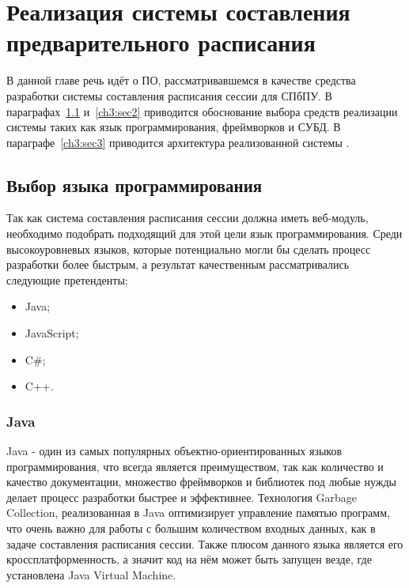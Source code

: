 \chapter{Реализация системы составления предварительного расписания} \label{ch3}
В данной главе речь идёт о ПО, рассматривавшемся в качестве средства разработки системы составления расписания сессии для СПбПУ. В параграфах~\ref{ch3:sec1} и~\ref{ch3:sec2} приводится обоснование выбора средств реализации системы таких как язык программирования, фреймворков и СУБД. В параграфе~\ref{ch3:sec3} приводится архитектура реализованной системы .


\section{Выбор языка программирования} \label{ch3:sec1}
Так как система составления расписания сессии должна иметь веб-модуль, необходимо подобрать подходящий для этой цели язык программирования. Среди высокоуровневых языков, которые потенциально могли бы сделать процесс разработки более быстрым, а результат качественным рассматривались следующие претенденты: 
\begin{itemize}
	\item  Java;
	\item  JavaScript;
	\item  C\#;	
	\item  C++.	
\end{itemize}

\subsection{Java}
Java - один из самых популярных объектно-ориентированных языков программирования, что всегда является преимуществом, так как количество и качество документации, множество фреймворков и библиотек под любые нужды делает процесс разработки быстрее и эффективнее. Технология Garbage Collection, реализованная в Java оптимизирует управление памятью программ, что очень важно для работы с большим количеством входных данных, как в задаче составления расписания сессии. Также плюсом данного языка является его кроссплатформенность, а значит код на нём может быть запущен везде, где установлена Java Virtual Machine. 


